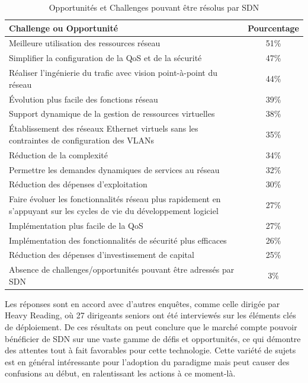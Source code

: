 \begin{table}[!h]
\centering
\begin{tabular}{|p{12cm}|c|}
\hline 
\bf Challenge ou Opportunité & \bf Pourcentage \\ 
\hline 
Meilleure utilisation des ressources réseau & 51\% \\ 
\hline 
Simplifier la configuration de la QoS et de la sécurité  & 47\%  \\
\hline 
Réaliser l'ingénierie du trafic avec vision point-à-point du réseau & 44\% \\ 
\hline 
Évolution plus facile des fonctions réseau & 39\% \\ 
\hline 
Support dynamique de la gestion de ressources virtuelles  & 38\% \\ 
\hline 
Établissement des réseaux Ethernet virtuels sans les contraintes de configuration des VLANs & 35\% \\ 
\hline 
Réduction de la complexité & 34\% \\ 
\hline 
Permettre les demandes dynamiques de services au réseau & 32\% \\ 
\hline 
Réduction des dépenses d'exploitation & 30\% \\ 
\hline 
Faire évoluer les fonctionnalités réseau plus rapidement en s'appuyant sur les cycles de vie du développement logiciel & 27\% \\ 
\hline 
Implémentation plus facile de la QoS & 27\% \\ 
\hline 
Implémentation des fonctionnalités de sécurité plus efficaces & 26\% \\ 
\hline 
Réduction des dépenses d'investissement de capital & 25\% \\ 
\hline 
Absence de challenges/opportunités pouvant être adressés par SDN & 3\% \\ 
\hline 
\end{tabular}
\caption{Opportunités et Challenges pouvant être résolus par SDN \cite{2013GuideSDNNVTable11}}
\end{table} 

\clearpage

Les réponses sont en accord avec d'autres enquêtes, comme celle dirigée par Heavy Reading, où 27 dirigeants seniors ont été interviewés    sur les éléments clés de déploiement. \cite{SDNNFVWAN} De ces résultats on peut conclure que le marché compte pouvoir bénéficier de SDN sur une vaste gamme de défis et opportunités, ce qui démontre des attentes tout à fait favorables pour cette technologie. Cette variété de sujets est en général intéressante pour l'adoption du \gls{paradigme} mais peut causer des confusions au début, en ralentissant les actions à ce moment-là.

